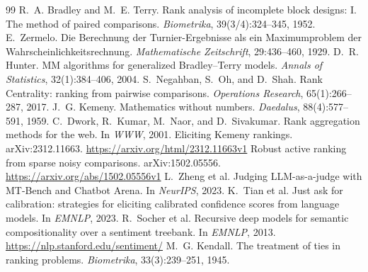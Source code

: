 \documentclass[11pt,a4paper]{article}
\begin{document}
\begin{thebibliography}{99}
 R.~A. Bradley and M.~E. Terry.
  Rank analysis of incomplete block designs: I. The method of paired
  comparisons. \emph{Biometrika}, 39(3/4):324--345, 1952.
 E.~Zermelo.
  Die Berechnung der Turnier-Ergebnisse als ein Maximumproblem der
  Wahrscheinlichkeitsrechnung. \emph{Mathematische Zeitschrift},
  29:436--460, 1929.
 D.~R. Hunter.
  MM algorithms for generalized Bradley--Terry models.
  \emph{Annals of Statistics}, 32(1):384--406, 2004.
 S.~Negahban, S.~Oh, and D.~Shah.
  Rank Centrality: ranking from pairwise comparisons.
  \emph{Operations Research}, 65(1):266--287, 2017.
 J.~G. Kemeny.
  Mathematics without numbers. \emph{Daedalus}, 88(4):577--591, 1959.
 C.~Dwork, R.~Kumar, M.~Naor, and D.~Sivakumar.
  Rank aggregation methods for the web. In \emph{WWW}, 2001.
 Eliciting Kemeny rankings.
  arXiv:2312.11663. \url{https://arxiv.org/html/2312.11663v1}
 Robust active ranking from sparse noisy comparisons.
  arXiv:1502.05556. \url{https://arxiv.org/abs/1502.05556v1}
 L.~Zheng et al.
  Judging LLM-as-a-judge with MT-Bench and Chatbot Arena.
  In \emph{NeurIPS}, 2023.
 K.~Tian et al.
  Just ask for calibration: strategies for eliciting calibrated confidence
  scores from language models. In \emph{EMNLP}, 2023.
 R.~Socher et al.
  Recursive deep models for semantic compositionality over a sentiment
  treebank. In \emph{EMNLP}, 2013.
  \url{https://nlp.stanford.edu/sentiment/}
 M.~G. Kendall.
  The treatment of ties in ranking problems.
  \emph{Biometrika}, 33(3):239--251, 1945.
\end{thebibliography}
\end{document}
